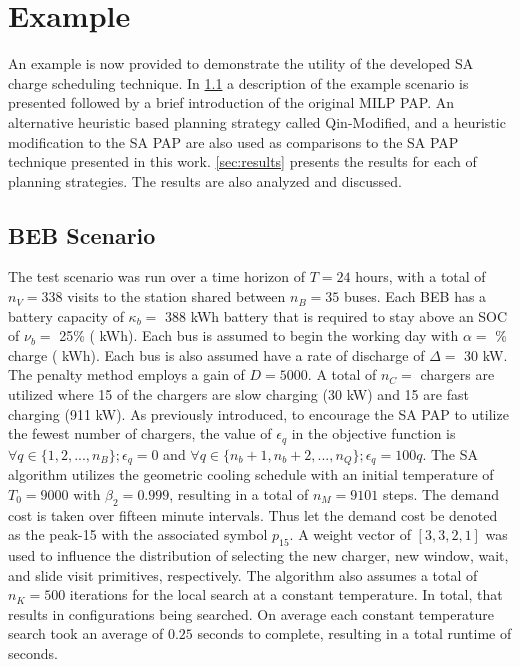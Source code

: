 \documentclass[11pt,a4paper,final]{article}
\newcommand{\A}{35 }                                                            %
\newcommand{\N}{338 }                                                           %
\newcommand{\Cgain}{5000}                                                       %
\newcommand{\acharge}{0.9}                                                      %
\newcommand{\mincharge}{25\% }                                                  %
\newcommand{\minchargeD}{0.25 }                                                 %
\newcommand{\batsize}{388 }                                                     %
\newcommand{\fast}{15 }                                                         %
\newcommand{\slow}{15 }                                                         %
\newcommand{\fasts}{911 }                                                       %
\newcommand{\slows}{30 }                                                        %
\newcommand{\localcnt}{500 }                                                    %
\newcommand{\tempinit}{9000 }                                                   %
\newcommand{\tempcnt}{9101 }                                                    %
\newcommand{\quicklocal}{0.25 }                                                %
\begin{document}
\section{Example}
\label{sec:example}
An example is now provided to demonstrate the utility of the developed SA charge scheduling technique. In
\ref{sec:beb-scenario} a description of the example scenario is presented followed by a brief introduction of the original
MILP PAP. An alternative heuristic based planning strategy called Qin-Modified, and a heuristic modification to the SA
PAP are also used as comparisons to the SA PAP technique presented in this work. \ref{sec:results} presents the results for
each of planning strategies. The results are also analyzed and discussed.

\subsection{BEB Scenario}
\label{sec:beb-scenario}
The test scenario was run over a time horizon of \(T=24\) hours, with a total of \(n_V = \N\) visits to the station shared
between \(n_B = \A\) buses. Each BEB has a battery capacity of \(\kappa_b =\) \batsize kWh battery that is required to stay above
an SOC of \(\nu_b =\) \mincharge (\fpeval{\batsize * \minchargeD} kWh). Each bus is assumed to begin the working day with \(\alpha
=\) \fpeval{\acharge*100}\% charge (\fpeval{\acharge * \batsize} kWh). Each bus is also assumed have a rate of discharge
of \(\Delta =\) 30 kW. The penalty method employs a gain of \(D = \Cgain\). A total of \(n_C =\) \fpeval{\fast + \slow} chargers
are utilized where \slow of the chargers are slow charging (\slows kW) and \fast are fast charging (\fasts kW). As
previously introduced, to encourage the SA PAP to utilize the fewest number of chargers, the value of \(\epsilon_q\) in the
objective function is \(\forall q \in \{1,2,..., n_B \}; \epsilon_q = 0\) and \(\forall q \in \{n_b + 1, n_b + 2,..., n_Q \}; \epsilon_q = 100q\). The SA
algorithm utilizes the geometric cooling schedule with an initial temperature of \(T_0 = \tempinit\) with \(\beta_2 = 0.999\),
resulting in a total of \(n_M = \tempcnt\) steps. The demand cost is taken over fifteen minute intervals. Thus let the
demand cost be denoted as the peak-15 with the associated symbol \(p_{15}\). A weight vector of \([3, 3, 2, 1]\) was used to
influence the distribution of selecting the new charger, new window, wait, and slide visit primitives, respectively. The
algorithm also assumes a total of \(n_K = \localcnt\) iterations for the local search at a constant temperature. In total,
that results in \fpeval{\localcnt * \tempcnt} configurations being searched. On average each constant
temperature search took an average of \(\quicklocal\) seconds to complete, resulting in a total runtime of
\fpeval{\quicklocal * \tempcnt} seconds.
\end{document}
